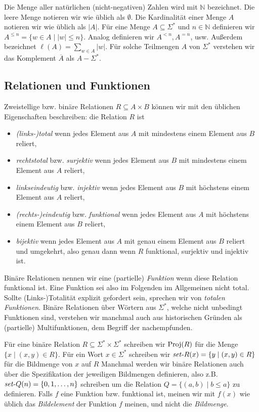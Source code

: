 Die Menge aller natürlichen (nicht-negativen) Zahlen wird mit $\mathbb N$ bezeichnet. Die leere Menge notieren wir wie üblich als $\emptyset$. Die Kardinalität einer Menge $A$ notieren wir wie üblich als $|A|$. Für eine Menge $A\subseteq\Sigma^*$ und $n\in \mathbb N$ definieren wir $A^{\leq n} = \{ w\in A \mid |w|\leq n\}$. Analog definieren wir $A^{<n}, A^{=n}$, usw. Außerdem bezeichnet $\ell(A)=\sum_{w\in A} |w|$. Für solche Teilmengen $A$ von $\Sigma^*$ verstehen wir das Komplement $\overline{A}$ als $A-\Sigma^*$.

\subsection*{Relationen und Funktionen}

Zweistellige bzw. binäre Relationen $R\subseteq A\times B$ können wir mit den üblichen Eigenschaften beschreiben: die Relation $R$ ist
\begin{itemize}
    \item \emph{(links-)total} wenn jedes Element aus $A$ mit mindestens einem Element aus $B$ reliert,
    \item \emph{rechtstotal} bzw. \emph{surjektiv} wenn jedes Element aus $B$ mit mindestens einem Element aus $A$ reliert,
    \item \emph{linkseindeutig} bzw. \emph{injektiv} wenn jedes Element aus $B$ mit höchstens einem Element aus $A$ reliert,
    \item \emph{(rechts-)eindeutig} bzw. \emph{funktional} wenn jedes Element aus $A$ mit höchstens einem Element aus $B$ reliert,
    \item \emph{bijektiv} wenn jedes Element aus $A$ mit genau einem Element aus $B$ reliert und umgekehrt, also genau dann wenn $R$ funktional, surjektiv und injektiv ist.
\end{itemize}
Binäre Relationen nennen wir eine (partielle) \emph{Funktion} wenn diese Relation funktional ist. Eine Funktion sei also im Folgenden im Allgemeinen nicht total. Sollte (Links-)Totalität explizit gefordert sein, sprechen wir von \emph{totalen Funktionen}.
Binäre Relationen über Wörtern aus $\Sigma^*$, welche nicht unbedingt Funktionen sind, verstehen wir manchmal auch aus historischen Gründen als (partielle) Multifunktionen, dem Begriff der  nachempfunden.

Für eine binäre Relation $R\subseteq\Sigma^* \times \Sigma^*$ schreiben wir $\operatorname{Proj}(R)$ für die Menge $\{ x\mid (x,y)\in R \}$. 
Für ein Wort $x\in\Sigma^*$ schreiben wir $\mathit{set}\text{-}{}R(x)=\{ y\mid (x,y)\in R \}$ für die Bildmenge von $x$ auf $R$
Manchmal werden wir binäre Relationen auch über die Spezifikation der jeweiligen Bildmengen definieren, also z.B. $\mathit{set}\text{-}{}Q(n) = \{ 0, 1, \dots, n\}$ schreiben um die Relation $Q=\{ (a,b)\mid b\leq a \}$ zu definieren.
Falls $f$ eine Funktion bzw. funktional ist, meinen wir mit $f(x)$ wie üblich das \emph{Bildelement} der Funktion $f$ meinen, und nicht die \emph{Bildmenge}. 



